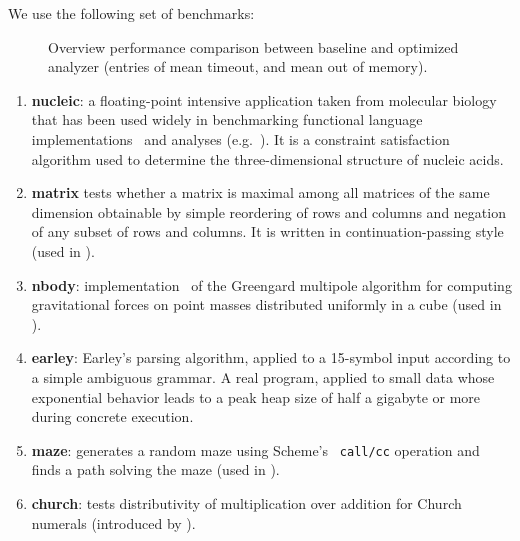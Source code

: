 \documentclass[preprint,onecolumn,9pt]{sigplanconf} %
\begin{document}
We use the following set of benchmarks:
\begin{figure}
\centering

\caption{Overview performance comparison between baseline and
  optimized analyzer (entries of  mean timeout, and  mean out of memory).}
\label{fig:bench-overview}
\end{figure}

\begin{enumerate}  %

\item {\bf nucleic}: a floating-point intensive application taken from
  molecular biology that has been used widely in benchmarking
  functional language
  implementations~\cite{dvanhorn:Hartel1996Benchmarking} and analyses
  (e.g.~\cite{dvanhorn:wright-jagannathan-toplas98,dvanhorn:jagannathan-etal-popl98}).
  It is a constraint satisfaction algorithm used to determine the
  three-dimensional structure of nucleic acids.

\item {\bf matrix} tests whether a matrix is maximal among all
  matrices of the same dimension obtainable by simple reordering of
  rows and columns and negation of any subset of rows and columns.  It
  is written in continuation-passing style (used in
  \cite{dvanhorn:wright-jagannathan-toplas98,dvanhorn:jagannathan-etal-popl98}).


\item {\bf nbody}: implementation~\cite{ianjohnson:nbody87} of the
  Greengard multipole algorithm for computing gravitational forces on
  point masses distributed uniformly in a cube (used in
  \cite{dvanhorn:wright-jagannathan-toplas98,dvanhorn:jagannathan-etal-popl98}).

\item {\bf earley}: Earley's parsing algorithm, applied to a 15-symbol
  input according to a simple ambiguous grammar.  A real program,
  applied to small data whose exponential behavior leads to a peak
  heap size of half a gigabyte or more during concrete execution.

\item {\bf maze}: generates a random maze using Scheme's {\tt
  call/cc} operation and finds a path solving
  the maze (used in
  \cite{dvanhorn:wright-jagannathan-toplas98,dvanhorn:jagannathan-etal-popl98}).

\item {\bf church}: tests distributivity of multiplication over
  addition for Church numerals (introduced by
  \cite{dvanhorn:Vardoulakis2011CFA2}).


\end{enumerate}
\end{document}
